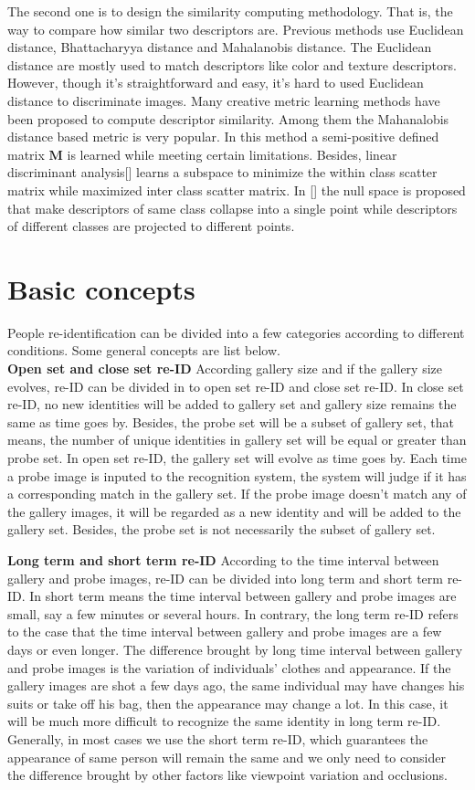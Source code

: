 The second one is to design the similarity computing methodology. That is, the way to compare how similar two descriptors are. Previous methods use Euclidean distance, Bhattacharyya distance and Mahalanobis distance. The Euclidean distance are mostly used to match descriptors like color and texture descriptors. However, though it's straightforward and easy, it's hard to used Euclidean distance to discriminate images. 
Many creative metric learning methods have been proposed to compute descriptor similarity. Among them the Mahanalobis distance based metric is very popular. In this method a semi-positive defined matrix $\bm{M}$ is learned while meeting certain limitations. Besides, linear discriminant analysis[] learns a subspace to minimize the within class scatter matrix while maximized inter class scatter matrix. In [] the null space is proposed that make descriptors of same class collapse into a single point while descriptors of different classes are projected to different points. 
	
\section{Basic concepts}
People re-identification can be divided into a few categories according to different conditions. Some general concepts are list below.\\
\textbf{Open set and close set re-ID} According gallery size and if the gallery size evolves, re-ID can be divided in to open set re-ID and close set re-ID. In close set re-ID, no new identities will be added to gallery set and gallery size remains the same as time goes by. Besides, the probe set will be a subset of gallery set, that means, the number of unique identities in gallery set will be equal or greater than probe set. In open set re-ID, the gallery set will evolve as time goes by. Each time a probe image is inputed to the recognition system, the system will judge if it has a corresponding match in the gallery set. If the probe image doesn't match any of the gallery images, it will be regarded as a new identity and will be added to the gallery set. Besides, the probe set is not necessarily the subset of gallery set. 

\textbf{Long term and short term re-ID} According to the time interval between gallery and probe images, re-ID can be divided into long term and short term re-ID.  In short term means the time interval between gallery and probe images are small, say a few minutes or several hours. In contrary, the long term re-ID refers to the case that the time interval between gallery and probe images are a few days or even longer. The difference brought by long time interval between gallery and probe images is the variation of individuals' clothes and appearance. If the gallery images are shot a few days ago, the same individual may have changes his suits or take off his bag, then the appearance may change a lot. In this case, it will be much more difficult to recognize the same identity in long term re-ID. Generally, in most cases we use the short term re-ID, which guarantees the appearance of same person will remain the same and we only need to consider the difference brought by other factors like viewpoint variation and occlusions.


